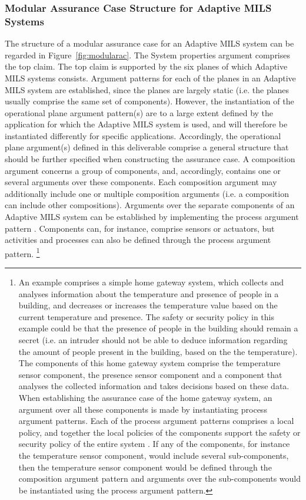 \documentclass[12pt,twoside,a4paper]{article}
\begin{document}
\subsubsection{Modular Assurance Case Structure for Adaptive MILS Systems} \label{sec:modularassurancecaseargpat}
The structure of a modular assurance case for an Adaptive MILS system can be regarded in Figure~\ref{fig:modularac}. The System properties argument comprises the top claim. The top claim is supported by the six planes of which Adaptive MILS systems consists. Argument patterns for each of the planes in an Adaptive MILS system are established, since the planes are largely static (i.e. the planes usually comprise the same set of components). However, the instantiation of the operational plane argument pattern(s) are to a large extent defined by the application for which the Adaptive MILS system is used, and will therefore be instantiated differently for specific applications. Accordingly, the operational plane argument(s) defined in this deliverable comprise a general structure that should be further specified when constructing the assurance case. A composition argument concerns a group of components, and, accordingly, contains one or several arguments over these components. Each composition argument may additionally include one or multiple composition arguments (i.e. a composition can include other compositions). Arguments over the separate components of an Adaptive MILS system can be established by implementing the process argument pattern \cite{D-MILS-D2.4}. Components can, for instance, comprise sensors or actuators, but activities and processes can also be defined through the process argument pattern. \footnote{An example comprises a simple home gateway system, which collects and analyses information about the temperature and presence of people in a building, and decreases or increases the temperature value based on the current temperature and presence. The safety or security policy in this example could be that the presence of people in the building should remain a secret (i.e. an intruder should not be able to deduce information regarding the amount of people present in the building, based on the the temperature). The components of this home gateway system comprise the temperature sensor component, the presence sensor component and a component that analyses the collected information and takes decisions based on these data. When establishing the assurance case of the home gateway system, an argument over all these components is made by instantiating process argument patterns. Each of the process argument patterns comprises a local policy, and together the local policies of the components support the safety or security policy of the entire system \cite{D-MILS-D2.2}. If any of the components, for instance the temperature sensor component, would include several sub-components, then the temperature sensor component would be defined through the composition argument pattern and arguments over the sub-components would be instantiated using the process argument pattern.}  
\end{document}
